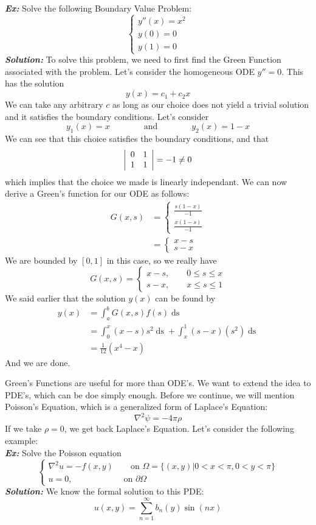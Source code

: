 \noindent\textbf{\textit{Ex:}} Solve the following Boundary Value Problem:
\[
\begin{cases*}
y''(x) = x^{2}\\
y(0) = 0\\
y(1) = 0
\end{cases*}
\]
\indent\textbf{\textit{Solution:}} To solve this problem, we need to first find the Green Function
associated with the problem. Let's consider the homogeneous ODE $y'' = 0$. This has the solution
\[
y(x) = c_{1} + c_{2}x
\]
We can take any arbitrary $c$ as long as our choice does not yield a trivial solution and it satisfies
the boundary conditions. Let's consider
\[
y_{1}(x) = x\qquad\qquad\text{and}\qquad\qquad y_{2}(x) = 1 - x
\]
We can see that this choice satisfies the boundary conditions, and that
\[
\left|
\begin{array}{c c}
0 & 1\\
1 & 1
\end{array}\right|
= -1 \neq 0
\]
which implies that the choice we made is linearly independant. We can now derive a Green's function
for our ODE as follows:
\begin{align*}
G(x,s) &=
\begin{cases*}
\frac{s(1-x)}{-1}\\
\frac{x(1-s)}{-1}
\end{cases*}\\
&=
\begin{cases*}
x-s\\
s-x
\end{cases*}
\end{align*}
We are bounded by $[0,1]$ in this case, so we really have
\[
G(x,s) =
\begin{cases*}
x-s,\qquad 0\leq s\leq x\\
s-x,\qquad x\leq s\leq 1
\end{cases*}
\]
We said earlier that the solution $y(x)$ can be found by
\begin{align*}
y(x) &= \int_{a}^{b}G(x,s)f(s)\mathop{ds}\\
&= \int_{0}^{x}(x-s)s^{2}\mathop{ds} + \int_{x}^{1}(s-x)(s^{2})\mathop{ds}\\
&= \frac{1}{12}(x^{4} - x)
\end{align*}
And we are done.
\newpage

Green's Functions are useful for more than ODE's. We want to extend the idea to PDE's, which can
be doe simply enough. Before we continue, we will mention Poisson's Equation, which is a
generalized form of Laplace's Equation:
\[
\nabla^{2}\psi = -4\pi\rho
\]
If we take $\rho = 0$, we get back Laplace's Equation. Let's consider the following example:\\


\noindent\textbf{\textit{Ex:}} Solve the Poisson equation
\[
\begin{cases*}
\nabla^{2}u = -f(x,y)\qquad \text{on }\Omega = \{(x,y)|0<x<\pi,0<y<\pi\}\\
u = 0,\qquad\qquad\qquad\text{on } \partial\Omega
\end{cases*}
\]
\indent\textbf{\textit{Solution:}} We know the formal solution to this PDE:
\[
u(x,y) = \sum_{n=1}^{\infty}b_{n}(y)\sin{(nx)}
\]

